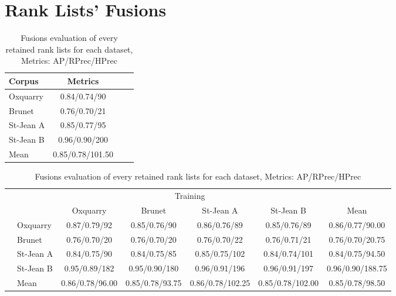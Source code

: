 \section*{Rank Lists' Fusions}

\begin{table}[H]
  \centering
  \caption{Fusions evaluation of every retained rank lists for each dataset, Metrics: AP/RPrec/HPrec}
  \label{tab:fusions_scores}

  \begin{tabular}{l c c c}
    \toprule
    Corpus         & Metrics \\
    \midrule
    Oxquarry       & 0.84/0.74/90 \\
    Brunet         & 0.76/0.70/21 \\
    St-Jean A      & 0.85/0.77/95 \\
    St-Jean B      & 0.96/0.90/200 \\
    \midrule
    Mean           & 0.85/0.78/101.50 \\
    \bottomrule
  \end{tabular}

  \vspace{0.5cm}

  \begin{tabular}{l l| c c c c|c}
    \toprule
    \multicolumn{2}{c}{\multirow{2}{*}{}} & \multicolumn{4}{c}{Training} \\
    \multicolumn{2}{c}{} & Oxquarry & Brunet & St-Jean A & St-Jean B & Mean \\
    \midrule
    \parbox[t]{2mm}{}
    & Oxquarry  & 0.87/0.79/92 & 0.85/0.76/90 & 0.86/0.76/89 & 0.85/0.76/89 & 0.86/0.77/90.00 \\
    & Brunet    & 0.76/0.70/20 & 0.76/0.70/20 & 0.76/0.70/22 & 0.76/0.71/21 & 0.76/0.70/20.75 \\
    & St-Jean A & 0.84/0.75/90 & 0.84/0.75/85 & 0.85/0.75/102 & 0.84/0.74/101 & 0.84/0.75/94.50 \\
    & St-Jean B & 0.95/0.89/182 & 0.95/0.90/180 & 0.96/0.91/196 & 0.96/0.91/197 & 0.96/0.90/188.75 \\
    \midrule
    & Mean      & 0.86/0.78/96.00 & 0.85/0.78/93.75 & 0.86/0.78/102.25 & 0.85/0.78/102.00 & 0.85/0.78/98.50 \\
    \bottomrule
  \end{tabular}

\end{table}
